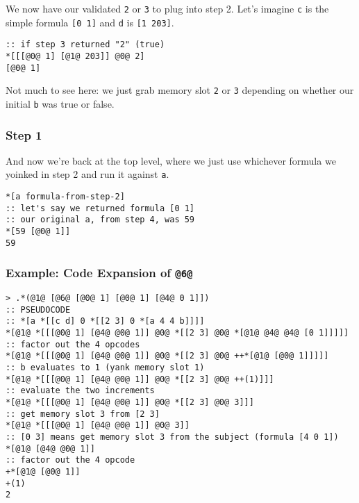 \documentclass[twoside]{article}
\begin{document}
We now have our validated \lstinline[style=inlinecode]{2} or \lstinline[style=inlinecode]{3} to plug into step 2. Let's imagine \lstinline[style=inlinecode]{c} is the simple formula \lstinline[style=inlinecode]{[0 1]} and \lstinline[style=inlinecode]{d} is \lstinline[style=inlinecode]{[1 203]}.

\begin{lstlisting}[style=listingcode]
:: if step 3 returned "2" (true)
*[[[@0@ 1] [@1@ 203]] @0@ 2]
[@0@ 1]
\end{lstlisting}

Not much to see here: we just grab memory slot \lstinline[style=inlinecode]{2} or \lstinline[style=inlinecode]{3} depending on whether our initial \lstinline[style=inlinecode]{b} was true or false.

\subsubsection{Step 1}

And now we're back at the top level, where we just use whichever formula we yoinked in step 2 and run it against \lstinline[style=inlinecode]{a}.

\begin{lstlisting}[style=listingcode]
*[a formula-from-step-2]
:: let's say we returned formula [0 1]
:: our original a, from step 4, was 59
*[59 [@0@ 1]]
59
\end{lstlisting}

\subsubsection{Example: Code Expansion of \lstinline[style=inlinecode]{@6@}}

\begin{lstlisting}[style=listingcode]
> .*(@1@ [@6@ [@0@ 1] [@0@ 1] [@4@ 0 1]])
:: PSEUDOCODE
:: *[a *[[c d] 0 *[[2 3] 0 *[a 4 4 b]]]]
*[@1@ *[[[@0@ 1] [@4@ @0@ 1]] @0@ *[[2 3] @0@ *[@1@ @4@ @4@ [0 1]]]]]
:: factor out the 4 opcodes
*[@1@ *[[[@0@ 1] [@4@ @0@ 1]] @0@ *[[2 3] @0@ ++*[@1@ [@0@ 1]]]]]
:: b evaluates to 1 (yank memory slot 1)
*[@1@ *[[[@0@ 1] [@4@ @0@ 1]] @0@ *[[2 3] @0@ ++(1)]]]
:: evaluate the two increments
*[@1@ *[[[@0@ 1] [@4@ @0@ 1]] @0@ *[[2 3] @0@ 3]]]
:: get memory slot 3 from [2 3]
*[@1@ *[[[@0@ 1] [@4@ @0@ 1]] @0@ 3]]
:: [0 3] means get memory slot 3 from the subject (formula [4 0 1])
*[@1@ [@4@ @0@ 1]]
:: factor out the 4 opcode
+*[@1@ [@0@ 1]]
+(1)
2
\end{lstlisting}
\end{document}
